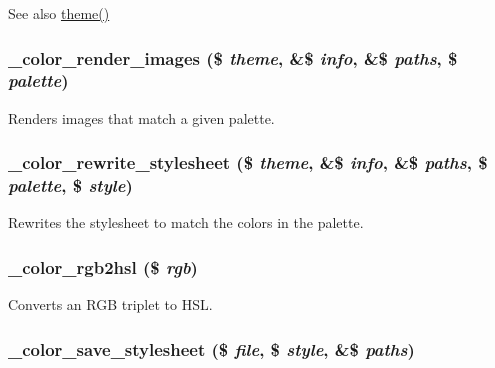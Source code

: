 \begin{DoxySeeAlso}{See also}
\hyperlink{includes_2theme_8inc_a7c25609a935874541a19657affd30fff}{theme()} 
\end{DoxySeeAlso}
\hypertarget{color_8module_a2a6f1003889c56a433d0223fa02849b2}{
\subsubsection[{\_\-color\_\-render\_\-images}]{\setlength{\rightskip}{0pt plus 5cm}\_\-color\_\-render\_\-images (\$ {\em theme}, \/  \&\$ {\em info}, \/  \&\$ {\em paths}, \/  \$ {\em palette})}}
\label{color_8module_a2a6f1003889c56a433d0223fa02849b2}
Renders images that match a given palette. \hypertarget{color_8module_aaf1af457b60024710ca91d4563463267}{
\subsubsection[{\_\-color\_\-rewrite\_\-stylesheet}]{\setlength{\rightskip}{0pt plus 5cm}\_\-color\_\-rewrite\_\-stylesheet (\$ {\em theme}, \/  \&\$ {\em info}, \/  \&\$ {\em paths}, \/  \$ {\em palette}, \/  \$ {\em style})}}
\label{color_8module_aaf1af457b60024710ca91d4563463267}
Rewrites the stylesheet to match the colors in the palette. \hypertarget{color_8module_ae85c23b1c5dd7c9e5dbb86f7684edb6c}{
\subsubsection[{\_\-color\_\-rgb2hsl}]{\setlength{\rightskip}{0pt plus 5cm}\_\-color\_\-rgb2hsl (\$ {\em rgb})}}
\label{color_8module_ae85c23b1c5dd7c9e5dbb86f7684edb6c}
Converts an RGB triplet to HSL. \hypertarget{color_8module_a571b92edd3294e4d7c87092cb3f695d3}{
\subsubsection[{\_\-color\_\-save\_\-stylesheet}]{\setlength{\rightskip}{0pt plus 5cm}\_\-color\_\-save\_\-stylesheet (\$ {\em file}, \/  \$ {\em style}, \/  \&\$ {\em paths})}}
